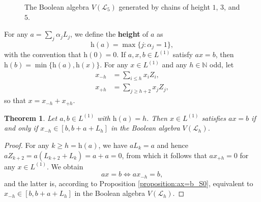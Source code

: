 \documentclass[a4paper, 11pt]{article}
\theoremstyle{plain}
\newtheorem{theorem}{Theorem}[section]
\theoremstyle{definition}
\newcommand{\N} {\mathbb{N}}
\newcommand{\Define}    [1] {\textbf{#1}}
\newcommand{\Height}    {\mathrm{h}}
\begin{document}
\begin{figure}
\centering
{}
    \caption{The Boolean algebra $V( \mathcal{L}_5 )$ generated by chains of height $1$, $3$, and $5$.} \label{figure:Z1Z3Z5}
\end{figure}

For any $a = \sum_j \alpha_j L_j$, we define the \Define{height} of $a$ as 
\[
    \Height( a ) = \max\{ j : \alpha_j = 1 \}, 
\]
with the convention that $\Height(0) = 0$. If $a, x, b \in L^{(1)}$ satisfy $a x = b$, then $\Height( b ) = \min\{ \Height( a ), \Height( x ) \}$. For any $x \in L^{(1)}$ and any $h \in \N$ odd, let
\begin{align*}
    x_{- h} &= \sum_{i \le h} x_i Z_i,\\
    x_{+ h} &= \sum_{j \ge h + 2} x_j Z_j,
\end{align*}
so that $x = x_{ -h } + x_{ +h }$.



\begin{theorem} \label{theorem:division_Lh}
Let $a, b \in L^{(1)}$ with $\Height( a ) = h$. Then $x \in L^{(1)}$ satisfies $a x = b$ if and only if $x_{ -h } \in [b, b + a + L_h]$ in the Boolean algebra $V( \mathcal{L}_h )$.
\end{theorem}

\begin{proof}
For any $k \ge h = \Height(a)$, we have $a L_k = a$ and hence $a Z_{k+2} = a ( L_{k+2} + L_k ) = a+a =0$, from which it follows that $a x_{ +h } = 0$ for any $x \in L^{(1)}$. We obtain
\[
    ax = b \iff a x_{ -h } = b,
\]
and the latter is, according to Proposition \ref{proposition:ax=b_S0}, equivalent to $x_{ -h } \in [b, b + a + L_h]$ in the Boolean algebra $V( \mathcal{L}_h )$.
\end{proof}
\end{document}
